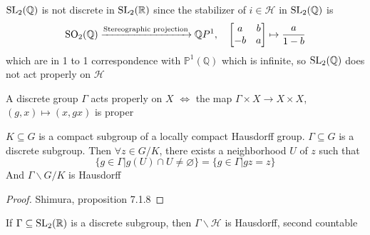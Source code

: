\documentclass[main]{subfiles}
\begin{document}
\begin{example}
$\operatorname{SL}_2(\mathbb Q)$ is not discrete in $\operatorname{SL}_2(\mathbb R)$ since the stabilizer of $i\in\mathcal H$ in $\operatorname{SL}_2(\mathbb Q)$ is
\[\operatorname{SO}_2(\mathbb Q)\xrightarrow{\text{Stereographic projection}}\mathbb QP^1,\quad\begin{bmatrix}
a&b\\
-b&a
\end{bmatrix}\mapsto\frac{a}{1-b}\]
which are in 1 to 1 correspondence with $\mathbb P^1(\mathbb Q)$ which is infinite, so $\operatorname{SL}_2(\mathbb Q)$ does not act properly on $\mathcal H$
\end{example}

\begin{remark}
A discrete group $\Gamma$ acts properly on $X$ $\iff$ the map $\Gamma\times X\to X\times X$, $(g,x)\mapsto(x,gx)$ is proper
\end{remark}

\begin{proposition}
$K\subseteq G$ is a compact subgroup of a locally compact Hausdorff group. $\Gamma\subseteq G$ is a discrete subgroup. Then $\forall z\in G/K$, there exists a neighborhood $U$ of $z$ such that
\[\{g\in\Gamma|g(U)\cap U\neq\varnothing\}=\{g\in\Gamma|gz=z\}\]
And $\Gamma\backslash G/K$ is Hausdorff
\end{proposition}

\begin{proof}
Shimura, proposition 7.1.8
\end{proof}

\begin{example}
If $\Gamma\subseteq\operatorname{SL}_2(\mathbb R)$ is a discrete subgroup, then $\Gamma\backslash\mathcal H$ is Hausdorff, second countable
\end{example}
\end{document}

